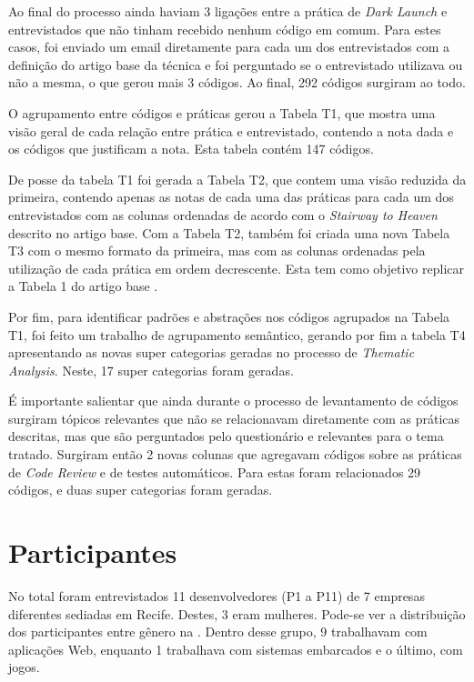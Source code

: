 Ao final do processo ainda haviam 3 ligações entre a prática de \emph{Dark Launch} e entrevistados que não tinham recebido nenhum código em comum. Para estes casos, foi enviado um email diretamente para cada um dos entrevistados com a definição do artigo base da técnica e foi perguntado se o entrevistado utilizava ou não a mesma, o que gerou mais 3 códigos. Ao final, 292 códigos surgiram ao todo.

O agrupamento entre códigos e práticas gerou a Tabela T1, que mostra uma visão geral de cada relação entre prática e entrevistado, contendo a nota dada e os códigos que justificam a nota. Esta tabela contém 147 códigos.

De posse da tabela T1 foi gerada a Tabela T2, que contem uma visão reduzida da primeira, contendo apenas as notas de cada uma das práticas para cada um dos entrevistados com as colunas ordenadas de acordo com o \emph{Stairway to Heaven} descrito no artigo base. Com a Tabela T2, também foi criada uma nova Tabela T3 com o mesmo formato da primeira, mas com as colunas ordenadas pela utilização de cada prática em ordem decrescente. Esta tem como objetivo replicar a Tabela 1 do artigo base \cite{empiricalStudy2016}.

Por fim, para identificar padrões e abstrações nos códigos agrupados na Tabela T1, foi feito um trabalho de agrupamento semântico, gerando por fim a tabela T4 apresentando as novas super categorias geradas no processo de \emph{Thematic Analysis}. Neste, 17 super categorias foram geradas.

É importante salientar que ainda durante o processo de levantamento de códigos surgiram tópicos relevantes que não se relacionavam diretamente com as práticas descritas, mas que são perguntados pelo questionário e relevantes para o tema tratado. Surgiram então 2 novas colunas que agregavam códigos sobre as práticas de \emph{Code Review} e de testes automáticos. Para estas foram relacionados 29 códigos, e duas super categorias foram geradas.

\section{Participantes}

No total foram entrevistados 11 desenvolvedores (P1 a P11) de 7 empresas diferentes sediadas em Recife. Destes, 3 eram mulheres. Pode-se ver a distribuição dos participantes entre gênero na . Dentro desse grupo, 9 trabalhavam com aplicações Web, enquanto 1 trabalhava com sistemas embarcados e o último, com jogos.

